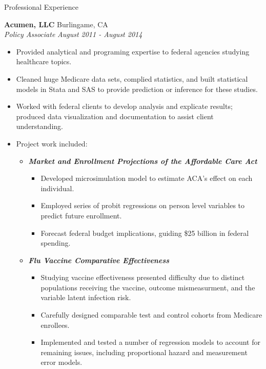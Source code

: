 \documentclass{resume} %
\begin{document}

\begin{rSection}{Professional Experience}

\vspace{0.2em}

{\bf Acumen, LLC} \hfill Burlingame, CA \\
{\em Policy Associate} \hfill {\em August 2011 - August 2014} \vspace{0.3em} 
\vspace{-0.2em}
\begin{itemize} \itemsep -0.2em
    \item Provided analytical and programing expertise to federal agencies studying healthcare  topics.
	\item Cleaned huge Medicare data sets, complied statistics, and built statistical models in Stata and SAS to provide prediction or inference for these studies.
    \item Worked with federal clients to develop analysis and explicate results; produced data visualization and documentation to assist client understanding. 
    \item Project work included:
    \begin{itemize} \itemsep -0.2em
    	\item {\bf \em Market and Enrollment Projections of the Affordable Care 		Act}
        \begin{itemize} \itemsep -0.2em
    		\item Developed microsimulation model to estimate ACA's effect on each individual. 	
            \item Employed series of probit regressions on person level variables to predict future enrollment. 
            \item Forecast federal budget implications, guiding \$25 billion in federal spending.
    	\end{itemize}
    	\item {\bf \em Flu Vaccine Comparative Effectiveness}
        \begin{itemize} \itemsep -0.2em
            \item Studying vaccine effectiveness presented difficulty due to distinct populations receiving the vaccine, outcome mismeasurment, and the variable latent infection risk. 
    		\item Carefully designed comparable test and control cohorts from Medicare enrollees.
            \item Implemented and tested a number of regression models to account for remaining issues, including proportional hazard and measurement error models. 
    	\end{itemize}


\end{itemize}
\end{itemize}
\end{rSection}
\end{document}
